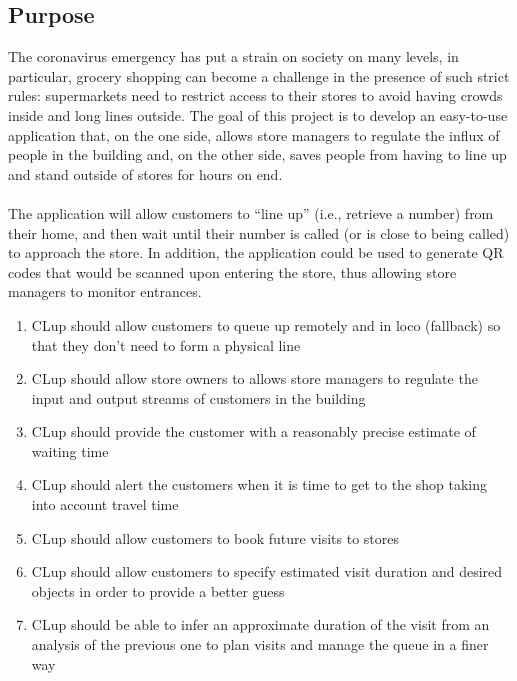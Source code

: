 \subsection{Purpose}
The coronavirus emergency has put a strain on society on many levels, in  particular,  grocery  shopping can  become  a  challenge  in  the presence  of  such  strict  rules: supermarkets  need to  restrict  access  to  their  stores  to  avoid having  crowds  inside and long  lines outside. The  goal  of  this  project  is  to  develop  an  easy-to-use  application  that,  on  the  one  side,  allows  store managers  to  regulate  the  influx  of  people  in  the  building  and,  on  the  other  side,  saves  people  from having to line up and stand outside of stores for hours on end. \\\\
The application will allow customers to “line up” (i.e., retrieve a number) from their home, and then wait  until  their  number  is  called  (or  is  close  to  being  called)  to  approach  the  store.  In  addition,  the application could be used to generate QR codes that would be scanned upon entering the store, thus allowing store managers to monitor entrances.

\begin{enumerate}
	\item CLup should allow customers to queue up remotely and in loco (fallback) so that they don't need to form a physical line
	\item CLup should allow store owners to allows store managers to regulate the input and output streams of customers in the building
	\item CLup should provide the customer with a reasonably precise estimate of waiting time
	\item CLup should alert the customers when it is time to get to the shop taking into account travel time
	\item CLup should allow customers to book future visits to stores
	\item CLup should allow customers to specify estimated visit duration and desired objects in order to provide a better guess
	\item CLup should be able to infer an approximate duration of the visit from an analysis of the previous one to plan visits and manage the queue in a finer way
\end{enumerate}


